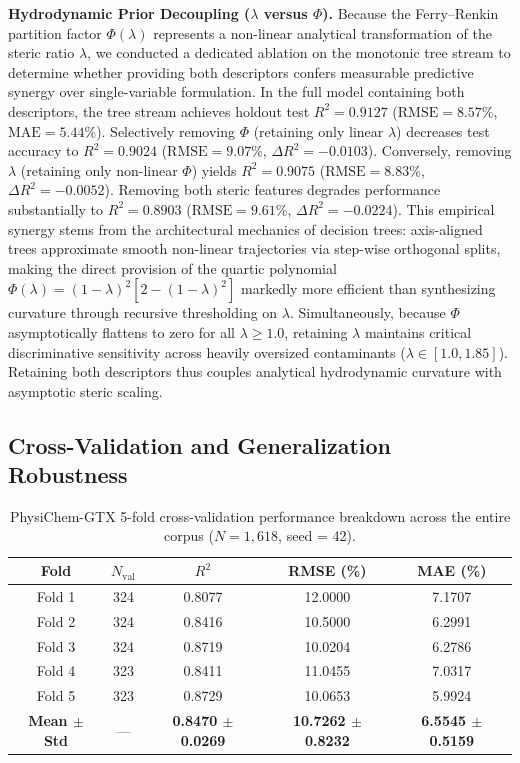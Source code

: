 \documentclass[11pt]{article}
\newcommand{\rsq}{R^{2}}
\begin{document}
\textbf{Hydrodynamic Prior Decoupling ($\lambda$ versus $\Phi$).} Because the Ferry--Renkin partition factor $\Phi(\lambda)$ represents a non-linear analytical transformation of the steric ratio $\lambda$, we conducted a dedicated ablation on the monotonic tree stream to determine whether providing both descriptors confers measurable predictive synergy over single-variable formulation. In the full model containing both descriptors, the tree stream achieves holdout test $\rsq = 0.9127$ ($\mathrm{RMSE} = 8.57\%$, $\mathrm{MAE} = 5.44\%$). Selectively removing $\Phi$ (retaining only linear $\lambda$) decreases test accuracy to $\rsq = 0.9024$ ($\mathrm{RMSE} = 9.07\%$, $\Delta \rsq = -0.0103$). Conversely, removing $\lambda$ (retaining only non-linear $\Phi$) yields $\rsq = 0.9075$ ($\mathrm{RMSE} = 8.83\%$, $\Delta \rsq = -0.0052$). Removing both steric features degrades performance substantially to $\rsq = 0.8903$ ($\mathrm{RMSE} = 9.61\%$, $\Delta \rsq = -0.0224$). This empirical synergy stems from the architectural mechanics of decision trees: axis-aligned trees approximate smooth non-linear trajectories via step-wise orthogonal splits, making the direct provision of the quartic polynomial $\Phi(\lambda) = (1-\lambda)^2[2-(1-\lambda)^2]$ markedly more efficient than synthesizing curvature through recursive thresholding on $\lambda$. Simultaneously, because $\Phi$ asymptotically flattens to zero for all $\lambda \geq 1.0$, retaining $\lambda$ maintains critical discriminative sensitivity across heavily oversized contaminants ($\lambda \in [1.0, 1.85]$). Retaining both descriptors thus couples analytical hydrodynamic curvature with asymptotic steric scaling.

\subsection{Cross-Validation and Generalization Robustness}
\label{subsec:cv}

\begin{table}[htbp]
\centering
\caption{PhysiChem-GTX 5-fold cross-validation performance breakdown across the entire corpus ($N=1{,}618$, seed = 42).}
\label{tab:cv}
\begin{tabular}{ccccc}
\toprule
Fold & $N_{\mathrm{val}}$ & $\rsq$ & RMSE (\%) & MAE (\%) \\
\midrule
Fold 1 & 324 & 0.8077 & 12.0000 & 7.1707 \\
Fold 2 & 324 & 0.8416 & 10.5000 & 6.2991 \\
Fold 3 & 324 & 0.8719 & 10.0204 & 6.2786 \\
Fold 4 & 323 & 0.8411 & 11.0455 & 7.0317 \\
Fold 5 & 323 & 0.8729 & 10.0653 & 5.9924 \\
\midrule
\textbf{Mean $\pm$ Std} & --- & \textbf{0.8470 $\pm$ 0.0269} & \textbf{10.7262 $\pm$ 0.8232} & \textbf{6.5545 $\pm$ 0.5159} \\
\bottomrule
\end{tabular}%

\end{table}
\end{document}
